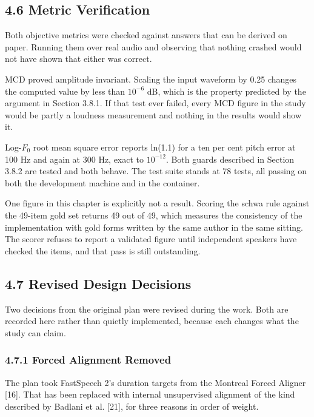 \documentclass[12pt,a4paper]{article}
\begin{document}
\subsection*{4.6  Metric Verification}
Both objective metrics were checked against answers that can be derived on paper. Running them over real audio and observing that nothing crashed would not have shown that either was correct.

MCD proved amplitude invariant. Scaling the input waveform by 0.25 changes the computed value by less than $10^{-6}$ dB, which is the property predicted by the argument in Section 3.8.1. If that test ever failed, every MCD figure in the study would be partly a loudness measurement and nothing in the results would show it.

Log-$F_0$ root mean square error reports ln(1.1) for a ten per cent pitch error at 100 Hz and again at 300 Hz, exact to $10^{-12}$. Both guards described in Section 3.8.2 are tested and both behave. The test suite stands at 78 tests, all passing on both the development machine and in the container.

One figure in this chapter is explicitly not a result. Scoring the schwa rule against the 49-item gold set returns 49 out of 49, which measures the consistency of the implementation with gold forms written by the same author in the same sitting. The scorer refuses to report a validated figure until independent speakers have checked the items, and that pass is still outstanding.

\subsection*{4.7  Revised Design Decisions}
Two decisions from the original plan were revised during the work. Both are recorded here rather than quietly implemented, because each changes what the study can claim.

\subsubsection*{4.7.1  Forced Alignment Removed}
The plan took FastSpeech 2's duration targets from the Montreal Forced Aligner [16]. That has been replaced with internal unsupervised alignment of the kind described by Badlani et al. [21], for three reasons in order of weight.
\end{document}
